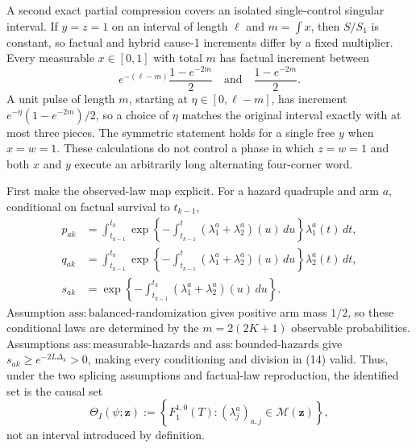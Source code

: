 A second exact partial compression covers an isolated single-control singular interval.  If \(y=z=1\) on an interval of length \(\ell\) and \(m=\int x\), then \(S/S_1\) is constant, so factual and hybrid cause-1 increments differ by a fixed multiplier.  Every measurable \(x\in[0,1]\) with total \(m\) has factual increment between
\[
 e^{-(\ell-m)}\frac{1-e^{-2m}}2
 \quad\text{and}\quad
 \frac{1-e^{-2m}}2.
\]
A unit pulse of length \(m\), starting at \(\eta\in[0,\ell-m]\), has increment \(e^{-\eta}(1-e^{-2m})/2\), so a choice of \(\eta\) matches the original interval exactly with at most three pieces.  The symmetric statement holds for a single free \(y\) when \(x=w=1\).  These calculations do not control a phase in which \(z=w=1\) and both \(x\) and \(y\) execute an arbitrarily long alternating four-corner word.

First make the observed-law map explicit.  For a hazard quadruple and arm \(a\), conditional on factual survival to \(t_{k-1}\),
\[
\begin{aligned}
 p_{ak}&=\int_{t_{k-1}}^{t_k}
 \exp\!\left\{-\int_{t_{k-1}}^t(\lambda_1^a+\lambda_2^a)(u)\,du\right\}
 \lambda_1^a(t)\,dt,\\
 q_{ak}&=\int_{t_{k-1}}^{t_k}
 \exp\!\left\{-\int_{t_{k-1}}^t(\lambda_1^a+\lambda_2^a)(u)\,du\right\}
 \lambda_2^a(t)\,dt,\\
 s_{ak}&=\exp\!\left\{-\int_{t_{k-1}}^{t_k}(\lambda_1^a+\lambda_2^a)(u)\,du\right\}.
\end{aligned}                                                     \tag{14}
\]
Assumption \(\mathrm{ass{:}balanced\text{-}randomization}\) gives positive arm mass \(1/2\), so these conditional laws are determined by the \(m=2(2K+1)\) observable probabilities.  Assumptions \(\mathrm{ass{:}measurable\text{-}hazards}\) and \(\mathrm{ass{:}bounded\text{-}hazards}\) give \(s_{ak}\ge e^{-2L\Delta_k}>0\), making every conditioning and division in (14) valid.  Thus, under the two splicing assumptions and factual-law reproduction, the identified set is the causal set
\[
 \Theta_I(\psi;\mathbf z)
 :=\left\{F_1^{1,0}(T):(\lambda_j^a)_{a,j}\in\mathcal M(\mathbf z)\right\},  \tag{15}
\]
not an interval introduced by definition.

